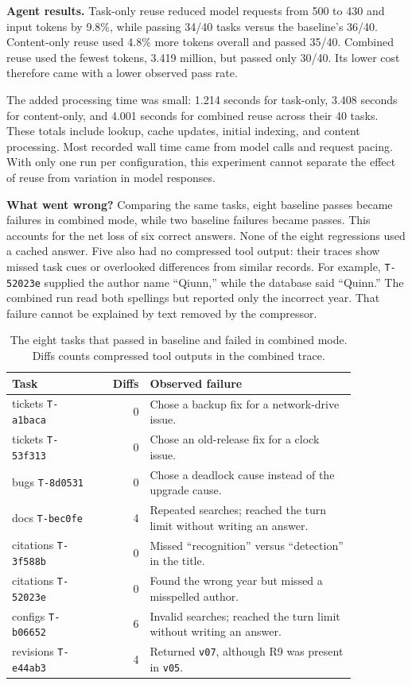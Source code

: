 \documentclass[10pt]{article}
\begin{document}


\textbf{Agent results.} Task-only reuse reduced model requests from 500 to 430
and input tokens by 9.8\%, while passing 34/40 tasks versus the baseline's
36/40. Content-only reuse used 4.8\% more tokens overall and passed 35/40.
Combined reuse used the fewest tokens, 3.419 million, but passed only 30/40.
Its lower cost therefore came with a lower observed pass rate.

The added processing time was small: 1.214 seconds for task-only, 3.408 seconds
for content-only, and 4.001 seconds for combined reuse across their 40 tasks.
These totals include lookup, cache updates, initial indexing, and content
processing. Most recorded wall time came from model calls and request pacing.
With only one run per configuration, this experiment cannot separate the effect
of reuse from variation in model responses.

\textbf{What went wrong?} Comparing the same tasks, eight baseline passes became
failures in combined mode, while two baseline failures became passes. This
accounts for the net loss of six correct answers. None of the eight regressions
used a cached answer. Five also had no compressed tool output: their traces
show missed task cues or overlooked differences from similar records.
For example, \texttt{T-52023e} supplied the author name ``Qiunn,'' while the
database said ``Quinn.'' The combined run read both spellings but reported
only the incorrect year. That failure cannot be explained by text removed by
the compressor.

\begin{table}[ht]
\centering\small
\begin{tabular}{p{0.26\linewidth}rp{0.60\linewidth}}
\toprule
Task & Diffs & Observed failure \\
\midrule
tickets \texttt{T-a1baca} & 0 & Chose a backup fix for a network-drive issue. \\
tickets \texttt{T-53f313} & 0 & Chose an old-release fix for a clock issue. \\
bugs \texttt{T-8d0531} & 0 & Chose a deadlock cause instead of the upgrade cause. \\
docs \texttt{T-bec0fe} & 4 & Repeated searches; reached the turn limit without writing an answer. \\
citations \texttt{T-3f588b} & 0 & Missed ``recognition'' versus ``detection'' in the title. \\
citations \texttt{T-52023e} & 0 & Found the wrong year but missed a misspelled author. \\
configs \texttt{T-b06652} & 6 & Invalid searches; reached the turn limit without writing an answer. \\
revisions \texttt{T-e44ab3} & 4 & Returned \texttt{v07}, although R9 was present in \texttt{v05}. \\
\bottomrule
\end{tabular}
\caption{The eight tasks that passed in baseline and failed in combined mode.
Diffs counts compressed tool outputs in the combined trace.}
\label{tab:failures}
\end{table}
\end{document}
